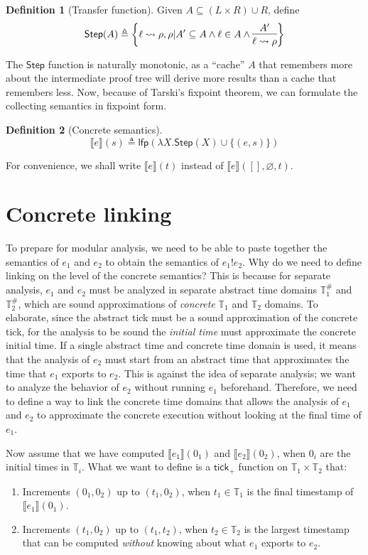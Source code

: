 \documentclass[acmsmall,review]{acmart}\settopmatter{printfolios=true,printccs=false,printacmref=false}
\theoremstyle{definition}
\newtheorem{definition}{Definition}[section]
\newcommand*{\A}[1]{{#1}^{\#}}
\newcommand*{\Time}{\mathbb{T}}
\newcommand*{\ATime}{\A{\Time}}
\newcommand*{\link}[2]{{#1}\mathtt{!}{#2}}
\newcommand*{\sembracket}[1]{\lBrack{#1}\rBrack}
\newcommand*{\tick}{\mathsf{tick}}
\begin{document}
\begin{definition}[Transfer function]
  Given $A\subseteq (L\times R)\cup R$, define
  \[
    \mathsf{Step}(A)\triangleq
    \left\{\ell\rightsquigarrow\rho, \rho|
    A'\subseteq A\wedge\ell\in A\wedge
    \begin{prooftree}[center=true]
      \hypo{A'}\infer1{\ell\rightsquigarrow \rho}
    \end{prooftree}\right\}
  \]
\end{definition}

The $\mathsf{Step}$ function is naturally monotonic, as a ``cache'' $A$ that remembers more about the intermediate proof tree will derive more results than a cache that remembers less.
Now, because of Tarski's fixpoint theorem, we can formulate the collecting semantics in fixpoint form.
\begin{definition}[Concrete semantics]
  \[
    \sembracket{e}(s)\triangleq\mathsf{lfp}(\lambda X.\mathsf{Step}(X)\cup\{(e,s)\})
  \]
\end{definition}
For convenience, we shall write $\sembracket{e}(t)$ instead of $\sembracket{e}([],\varnothing,t)$.
\section{Concrete linking}

To prepare for modular analysis, we need to be able to paste together the semantics of $e_1$ and $e_2$ to obtain the semantics of $\link{e_1}{e_2}$.
Why do we need to define linking on the level of the concrete semantics?
This is because for separate analysis, $e_1$ and $e_2$ must be analyzed in separate abstract time domains $\ATime_1$ and $\ATime_2$, which are sound approximations of \emph{concrete} $\Time_1$ and $\Time_2$ domains.
To elaborate, since the abstract tick must be a sound approximation of the concrete tick, for the analysis to be sound the \emph{initial time} must approximate the concrete initial time.
If a single abstract time and concrete time domain is used, it means that the analysis of $e_2$ must start from an abstract time that approximates the time that $e_1$ exports to $e_2$.
This is against the idea of separate analysis; we want to analyze the behavior of $e_2$ without running $e_1$ beforehand.
Therefore, we need to define a way to link the concrete time domains that allows the analysis of $e_1$ and $e_2$ to approximate the concrete execution without looking at the final time of $e_1$.

Now assume that we have computed $\sembracket{e_1}(0_1)$ and $\sembracket{e_2}(0_2)$, when $0_i$ are the initial times in $\Time_i$.
What we want to define is a $\tick_+$ function on $\Time_1\times\Time_2$ that:
\begin{enumerate}
  \item Increments $(0_1,0_2)$ up to $(t_1,0_2)$, when $t_1\in\Time_1$ is the final timestamp of $\sembracket{e_1}(0_1)$.
  \item Increments $(t_1,0_2)$ up to $(t_1,t_2)$, when $t_2\in\Time_2$ is the largest timestamp that can be computed \emph{without} knowing about what $e_1$ exports to $e_2$.
\end{enumerate}
\end{document}
